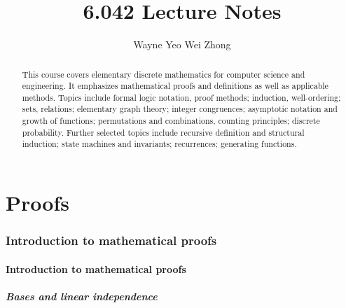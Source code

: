 \documentclass{article}
\title{6.042 Lecture Notes}
\author{Wayne Yeo Wei Zhong}
\numberwithin{theorem}{section}
\numberwithin{corollary}{section}
\numberwithin{postulate}{section}
\numberwithin{lemma}{section}
\numberwithin{definition}{section}
\begin{document}
\maketitle

\begin{abstract}
  This course covers elementary discrete mathematics for computer science and
  engineering. It emphasizes mathematical proofs and definitions as well as
  applicable methods. Topics include formal logic notation, proof methods;
  induction, well-ordering; sets, relations; elementary graph theory; integer
  congruences; asymptotic notation and growth of functions; permutations and
  combinations, counting principles; discrete probability. Further selected
  topics include recursive definition and structural induction; state machines
  and invariants; recurrences; generating functions.
\end{abstract}
\tableofcontents
\newpage

\part{Proofs}

\setcounter{section}{0}
\section{Introduction to mathematical proofs}

\subsection{Introduction to mathematical proofs}

\subsubsection{Bases and linear independence}
\end{document}
